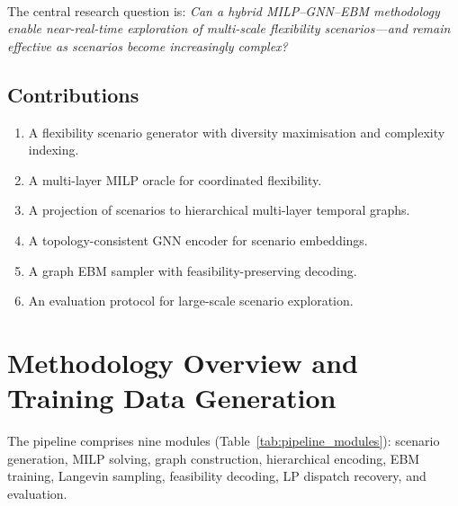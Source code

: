 \documentclass{article}
\begin{document}
\paragraph{}
The central research question is:
\emph{Can a hybrid MILP--GNN--EBM methodology enable near-real-time exploration of multi-scale flexibility scenarios---and remain effective as scenarios become increasingly complex?}

\subsection{Contributions}
\begin{enumerate}[label=\textbf{C\arabic*}, leftmargin=*, itemsep=2pt]
  \item A flexibility scenario generator with diversity maximisation and complexity indexing.
  \item A multi-layer MILP oracle for coordinated flexibility.
  \item A projection of scenarios to hierarchical multi-layer temporal graphs.
  \item A topology-consistent GNN encoder for scenario embeddings.
  \item A graph EBM sampler with feasibility-preserving decoding.
  \item An evaluation protocol for large-scale scenario exploration.
\end{enumerate}


\section{Methodology Overview and Training Data Generation}

The pipeline comprises nine modules (Table~\ref{tab:pipeline_modules}): scenario generation, MILP solving, graph construction, hierarchical encoding, EBM training, Langevin sampling, feasibility decoding, LP dispatch recovery, and evaluation.
\end{document}
